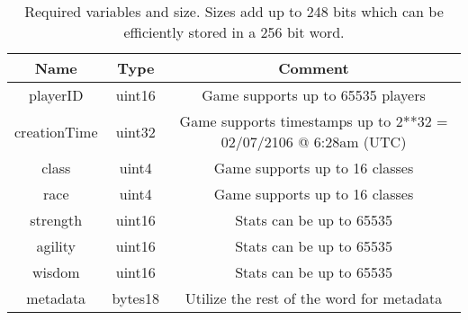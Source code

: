 \begin{table}[H]
	\centering
	\vspace*{-1ex}
	\scriptsize
	\vspace{-1ex}
    \label{table:characteristics}
	\begin{tabular}{|c|c|c|}
        \hline
        \textbf{Name} & \textbf{Type}  & \textbf{Comment}\\ \hline 
        playerID      & uint16         & Game supports up to 65535 players\\
        creationTime  & uint32         & Game supports timestamps up to 2**32 = 02/07/2106 @ 6:28am (UTC) \\
        class         & uint4          & Game supports up to 16 classes \\
        race          & uint4          & Game supports up to 16 classes \\
        strength      & uint16         & Stats can be up to 65535\\
        agility       & uint16         & Stats can be up to 65535 \\
        wisdom        & uint16         & Stats can be up to 65535 \\
        metadata      & bytes18        & Utilize the rest of the word for metadata \\
        \hline
    \end{tabular}
	\caption{Required variables and size. Sizes add up to 248 bits which can be efficiently stored in a 256 bit word.}
\end{table}
